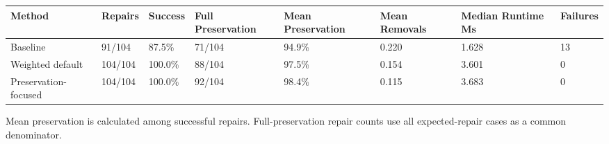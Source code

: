 \begin{tabularx}{\linewidth}{@{}lXXXXXXX@{}}
\hline
Method & Repairs & Success & Full Preservation & Mean Preservation & Mean Removals & Median Runtime Ms & Failures \\
\hline
Baseline & 91/104 & 87.5\% & 71/104 & 94.9\% & 0.220 & 1.628 & 13 \\
Weighted default & 104/104 & 100.0\% & 88/104 & 97.5\% & 0.154 & 3.601 & 0 \\
Preservation-focused & 104/104 & 100.0\% & 92/104 & 98.4\% & 0.115 & 3.683 & 0 \\
\hline
\end{tabularx}

\par\footnotesize Mean preservation is calculated among successful repairs. Full-preservation repair counts use all expected-repair cases as a common denominator.
